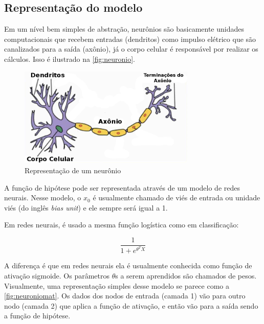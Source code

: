 \subsection{Representação do modelo}

Em um nível bem simples de abstração, neurônios são basicamente unidades computacionais que recebem entradas (dendritos) como impulso elétrico que são canalizados para a saída (axônio), já o corpo celular é responsável por realizar os cálculos. Isso é ilustrado na \autoref{fig:neuronio}.

\begin{figure}
\centering
\caption{Representação de um neurônio} \label{fig:neuronio}
\includegraphics[width=0.75\textwidth]{img/neuron}
\end{figure}


A função de hipótese pode ser representada através de um modelo de redes neurais. Nesse modelo, o $x_0$ é usualmente chamado de viés de entrada ou unidade viés (do inglês \textit{bias unit}) e ele sempre será igual a 1.

Em redes neurais, é usado a mesma função logística como em classificação:

\begin{equation}
\frac{1}{1 + e^{\theta^TX}} \nonumber
\end{equation}

A diferença é que em redes neurais ela é usualmente conhecida como função de ativação sigmoide. Os parâmetros $\theta$s a serem aprendidos são chamados de pesos. Visualmente, uma representação simples desse modelo se parece como a \autoref{fig:neuroniomat}. Os dados dos nodos de entrada (camada 1) vão para outro nodo (camada 2) que aplica a função de ativação, e então vão para a saída sendo a função de hipótese.

